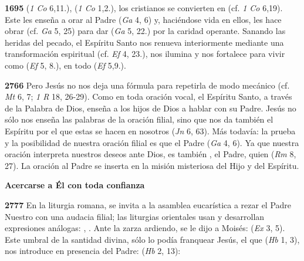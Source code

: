 \textbf{1695}  (\emph{1 Co} 6,11.),  (\emph{1 Co} 1,2.), los cristianos se convierten en  (cf. \emph{1 Co} 6,19). Este  les enseña a orar al Padre (\emph{Ga} 4, 6) y, haciéndose vida en ellos, les hace obrar (cf. \emph{Ga} 5, 25) para dar  (\emph{Ga} 5, 22.) por la caridad operante. Sanando las heridas del pecado, el Espíritu Santo nos renueva interiormente mediante una transformación espiritual (cf. \emph{Ef} 4, 23.), nos ilumina y nos fortalece para vivir como  (\emph{Ef} 5, 8.),  en todo (\emph{Ef} 5,9.).

\textbf{2766} Pero Jesús no nos deja una fórmula para repetirla de modo mecánico (cf. \emph{Mt} 6, 7; \emph{1 R} 18, 26-29). Como en toda oración vocal, el Espíritu Santo, a través de la Palabra de Dios, enseña a los hijos de Dios a hablar con su Padre. Jesús no sólo nos enseña las palabras de la oración filial, sino que nos da también el Espíritu por el que estas se hacen en nosotros  (\emph{Jn} 6, 63). Más todavía: la prueba y la posibilidad de nuestra oración filial es que el Padre  (\emph{Ga} 4, 6). Ya que nuestra oración interpreta nuestros deseos ante Dios, es también , el Padre, quien  (\emph{Rm} 8, 27). La oración al Padre se inserta en la misión misteriosa del Hijo y del Espíritu.

\textbf{Acercarse a Él con toda confianza}

\textbf{2777} En la liturgia romana, se invita a la asamblea eucarística a rezar el Padre Nuestro con una audacia filial; las liturgias orientales usan y desarrollan expresiones análogas: , . Ante la zarza ardiendo, se le dijo a Moisés:  (\emph{Ex} 3, 5). Este umbral de la santidad divina, sólo lo podía franquear Jesús, el que  (\emph{Hb} 1, 3), nos introduce en presencia del Padre:  (\emph{Hb} 2, 13):

